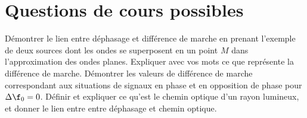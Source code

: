 \documentclass[a4paper, 12pt, final, garamond]{book}
\begin{document}
\section{Questions de cours possibles}
\begin{enumerate}

	\litem{\strr}%
	Démontrer le lien entre déphasage et différence de marche en prenant
	l'exemple de deux sources dont les ondes se superposent en un point $M$ dans
	l'approximation des ondes planes. Expliquer avec vos mots ce que représente
	la différence de marche.
	\smallbreak
	Démontrer les valeurs de différence de marche
	correspondant aux situations de signaux en phase et en opposition de phase
	pour $\Delta\f_0 = 0$.
	\smallbreak
	Définir et expliquer ce qu'est le chemin optique d'un rayon lumineux, et
	donner le lien entre entre déphasage et chemin optique.


\end{enumerate}
\end{document}
